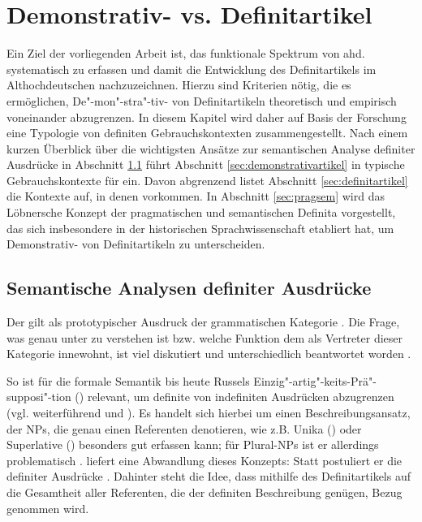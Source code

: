 \chapter{Demonstrativ- vs. Definitartikel}\label{chap:demdef}

Ein Ziel der vorliegenden Arbeit ist, das funktionale Spektrum von ahd.  systematisch zu erfassen und damit die Entwicklung des Definitartikels  im Althochdeutschen nachzuzeichnen. Hierzu sind  Kriterien nötig, die es ermöglichen, De"-mon"-stra"-tiv- von   Definitartikeln  theoretisch und empirisch voneinander abzugrenzen. In diesem Kapitel wird daher auf Basis der Forschung eine Typologie von definiten Gebrauchskontexten zusammengestellt. Nach einem kurzen Überblick über die wichtigsten Ansätze zur semantischen Analyse definiter Ausdrücke in Abschnitt \ref{sec:definitheitstheorien} führt Abschnitt \ref{sec:demonstrativartikel} in typische Gebrauchskontexte für   ein. Davon abgrenzend listet Abschnitt \ref{sec:definitartikel} die Kontexte auf, in denen  vorkommen. In Abschnitt \ref{sec:pragsem} wird das  Löbnersche Konzept der pragmatischen  und semantischen Definita  vorgestellt, das sich insbesondere in der historischen Sprachwissenschaft etabliert hat, um Demonstrativ- von Definitartikeln zu unterscheiden. 

\section{Semantische Analysen definiter Ausdrücke} \label{sec:definitheitstheorien}

Der  gilt als prototypischer Ausdruck der grammatischen Kategorie . Die Frage, was genau unter  zu verstehen ist bzw. welche Funktion dem  als Vertreter dieser Kategorie innewohnt, ist viel diskutiert und unterschiedlich beantwortet worden \parencite[zum Überblick  s.][]{Bisle-Muller1991,Hauenschild1993,Lyons1999,Abbott2007,Cui2014}.

So ist für die formale Semantik bis heute Russels Einzig"-artig"-keits-Prä"-supposi"-tion () relevant, um definite  von indefiniten  Ausdrücken abzugrenzen (vgl. weiterführend \citealt{Russel1905} und \citealt{Heim1991,Heim2011}). Es handelt sich hierbei um einen Beschreibungsansatz, der  NPs, die genau einen Referenten denotieren, wie z.B. Unika  () oder  Superlative () besonders gut erfassen kann; für  Plural-NPs ist er allerdings problematisch \parencite[vgl. die Diskussion hierzu in][7--11] {Lyons1999}. \textcite{Hawkins1978} liefert eine Abwandlung dieses Konzepts: Statt  postuliert er die  definiter Ausdrücke  \parencite[kritisch hierzu:][32]{Bisle-Muller1991}. Dahinter steht die Idee, dass mithilfe des Definitartikels  auf die Gesamtheit aller Referenten, die der definiten Beschreibung genügen, Bezug genommen wird.

